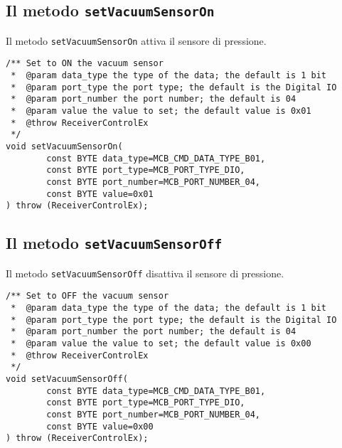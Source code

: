 \subsection{Il metodo \texttt{setVacuumSensorOn}}
Il metodo \texttt{setVacuumSensorOn} attiva il sensore di pressione.
\lstset{language=C++}
\begin{lstlisting}[caption={Dichiarazione del metodo \texttt{setVacuumSensorOn}},
label=lst:setVacuumSensorOn,mathescape]
/** Set to ON the vacuum sensor
 *  @param data_type the type of the data; the default is 1 bit
 *  @param port_type the port type; the default is the Digital IO
 *  @param port_number the port number; the default is 04
 *  @param value the value to set; the default value is 0x01
 *  @throw ReceiverControlEx
 */
void setVacuumSensorOn(
        const BYTE data_type=MCB_CMD_DATA_TYPE_B01,
        const BYTE port_type=MCB_PORT_TYPE_DIO,
        const BYTE port_number=MCB_PORT_NUMBER_04,
        const BYTE value=0x01
) throw (ReceiverControlEx);
\end{lstlisting}
\lstset{numbers=none}


\subsection{Il metodo \texttt{setVacuumSensorOff}}
Il metodo \texttt{setVacuumSensorOff} disattiva il sensore di pressione.
\lstset{language=C++}
\begin{lstlisting}[caption={Dichiarazione del metodo \texttt{setVacuumSensorOff}},
label=lst:setVacuumSensorOff,mathescape]
/** Set to OFF the vacuum sensor
 *  @param data_type the type of the data; the default is 1 bit
 *  @param port_type the port type; the default is the Digital IO
 *  @param port_number the port number; the default is 04
 *  @param value the value to set; the default value is 0x00
 *  @throw ReceiverControlEx
 */
void setVacuumSensorOff(
        const BYTE data_type=MCB_CMD_DATA_TYPE_B01,
        const BYTE port_type=MCB_PORT_TYPE_DIO,
        const BYTE port_number=MCB_PORT_NUMBER_04,
        const BYTE value=0x00
) throw (ReceiverControlEx);
\end{lstlisting}
\lstset{numbers=none}


